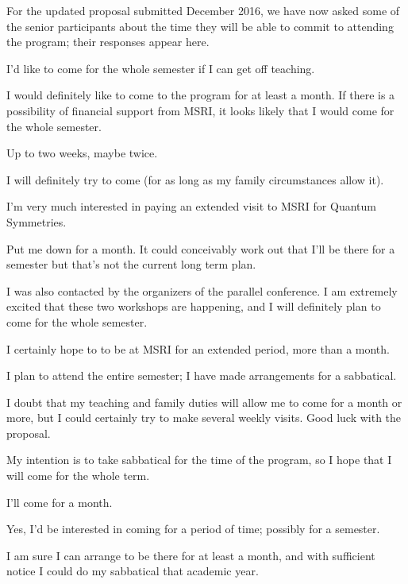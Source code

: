 \documentclass[12pt]{article}
\begin{document}
For the updated proposal submitted December 2016, we have now asked some of the senior participants about the time they will be able to commit to attending the program; their responses appear here.
\begin{description}
  \setlength{\itemsep}{1pt}
  \setlength{\parskip}{0pt}
  \setlength{\parsep}{0pt}
\item[David Ben-Zvi] I'd like to come for the whole semester if I can get off teaching.
\item[Dietmar Bisch] I would definitely like to come to the program for
at least a month. If there is a possibility of financial support from MSRI,
it looks likely that I would come for the whole semester.
\item[Inna Entova] Up to two weeks, maybe twice.
\item[Andr\'e Henriques] I will definitely try to come (for as long as my family circumstances allow it).
\item[Masaki Izumi] I'm very much interested in paying an extended visit to MSRI for Quantum Symmetries. 
\item[Vaughan Jones] Put me down for a month. It could conceivably work out that I'll be there for
a semester but that's not the current long term plan.
\item[David Jordan] I was also contacted by the organizers of the parallel conference. I am extremely excited that these two workshops are happening, and I will definitely plan to come for the whole semester.
\item[Yasuyuki Kawahigashi] I certainly hope to to be at MSRI for an extended period, more than a month.
\item[Scott Morrison] I plan to attend the entire semester; I have made arrangements for a sabbatical.
\item[Dmitri Nikshych] I doubt that my teaching and family duties will allow me to come for
a month or more, but I could certainly try to make several weekly 
visits. Good luck with the proposal.
\item[Victor Ostrik] My intention is to take sabbatical for the time of the program,
so I hope that I will come for the whole term.
\item[David Penneys] I'll come for a month.
\item[Julia Pevtsova] Yes, I'd be interested in coming for a period of time; possibly for a semester.
\item[Eric Rowell] I am sure I can arrange to be there for at least a month, and with sufficient notice I could do my sabbatical that academic year.

\end{description}
\end{document}
